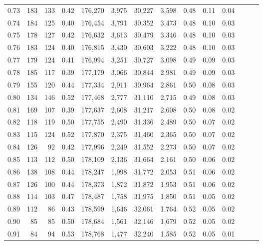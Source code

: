 \begin{tabular}{rrrrrrrrrrrrrr}
0.73 &    183 &  133 &  0.42 &  176,270 &    3,975 &  30,227 &   3,598 &  0.48 &  0.11 &      0.04 \\
0.74 &    184 &  125 &  0.40 &  176,454 &    3,791 &  30,352 &   3,473 &  0.48 &  0.10 &      0.03 \\
0.75 &    178 &  127 &  0.42 &  176,632 &    3,613 &  30,479 &   3,346 &  0.48 &  0.10 &      0.03 \\
0.76 &    183 &  124 &  0.40 &  176,815 &    3,430 &  30,603 &   3,222 &  0.48 &  0.10 &      0.03 \\
0.77 &    179 &  124 &  0.41 &  176,994 &    3,251 &  30,727 &   3,098 &  0.49 &  0.09 &      0.03 \\
0.78 &    185 &  117 &  0.39 &  177,179 &    3,066 &  30,844 &   2,981 &  0.49 &  0.09 &      0.03 \\
0.79 &    155 &  120 &  0.44 &  177,334 &    2,911 &  30,964 &   2,861 &  0.50 &  0.08 &      0.03 \\
0.80 &    134 &  146 &  0.52 &  177,468 &    2,777 &  31,110 &   2,715 &  0.49 &  0.08 &      0.03 \\
0.81 &    169 &  107 &  0.39 &  177,637 &    2,608 &  31,217 &   2,608 &  0.50 &  0.08 &      0.02 \\
0.82 &    118 &  119 &  0.50 &  177,755 &    2,490 &  31,336 &   2,489 &  0.50 &  0.07 &      0.02 \\
0.83 &    115 &  124 &  0.52 &  177,870 &    2,375 &  31,460 &   2,365 &  0.50 &  0.07 &      0.02 \\
0.84 &    126 &   92 &  0.42 &  177,996 &    2,249 &  31,552 &   2,273 &  0.50 &  0.07 &      0.02 \\
0.85 &    113 &  112 &  0.50 &  178,109 &    2,136 &  31,664 &   2,161 &  0.50 &  0.06 &      0.02 \\
0.86 &    138 &  108 &  0.44 &  178,247 &    1,998 &  31,772 &   2,053 &  0.51 &  0.06 &      0.02 \\
0.87 &    126 &  100 &  0.44 &  178,373 &    1,872 &  31,872 &   1,953 &  0.51 &  0.06 &      0.02 \\
0.88 &    114 &  103 &  0.47 &  178,487 &    1,758 &  31,975 &   1,850 &  0.51 &  0.05 &      0.02 \\
0.89 &    112 &   86 &  0.43 &  178,599 &    1,646 &  32,061 &   1,764 &  0.52 &  0.05 &      0.02 \\
0.90 &     85 &   85 &  0.50 &  178,684 &    1,561 &  32,146 &   1,679 &  0.52 &  0.05 &      0.02 \\
0.91 &     84 &   94 &  0.53 &  178,768 &    1,477 &  32,240 &   1,585 &  0.52 &  0.05 &      0.01 \\

\end{tabular}
